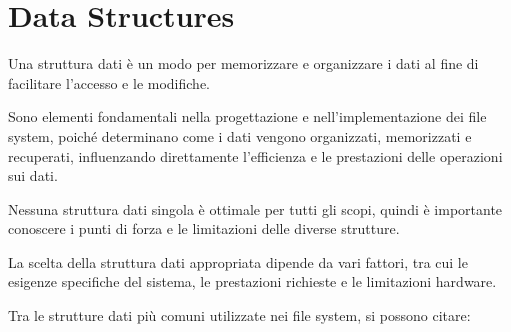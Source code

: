 \documentclass[12pt,a4paper,openright,twoside]{book}
\begin{document}
    \section{Data Structures}

        Una struttura dati è un modo per memorizzare e organizzare i dati al fine di facilitare l'accesso e le modifiche.

        Sono elementi fondamentali nella progettazione e nell'implementazione dei file system, poiché determinano come i dati vengono organizzati, memorizzati e recuperati, influenzando direttamente l'efficienza e le prestazioni delle operazioni sui dati.

        Nessuna struttura dati singola è ottimale per tutti gli scopi, quindi è importante conoscere i punti di forza e le limitazioni delle diverse strutture.

        La scelta della struttura dati appropriata dipende da vari fattori, tra cui le esigenze specifiche del sistema, le prestazioni richieste e le limitazioni hardware.

        Tra le strutture dati più comuni utilizzate nei file system, si possono citare:
\end{document}
